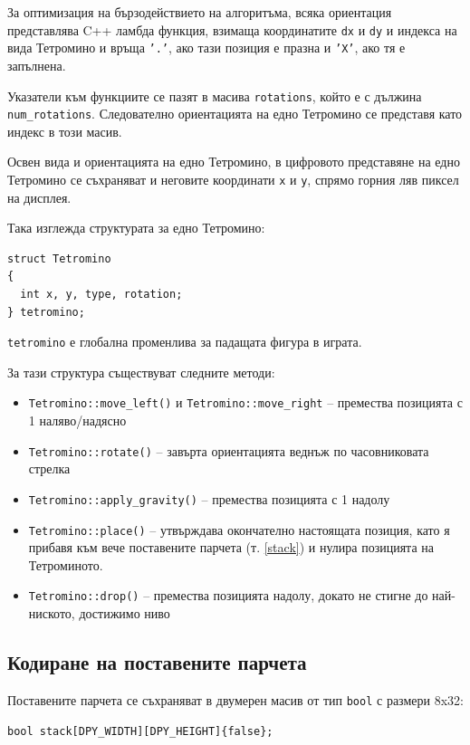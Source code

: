 \documentclass[titlepage, oneside, 12pt]{book}
\begin{document}
За оптимизация на бързодействието на алгоритъма, всяка ориентация представлява C++ ламбда функция, взимаща
координатите \texttt{dx} и \texttt{dy} и индекса на вида Тетромино и връща \texttt{'.'}, ако тази позиция е празна
и \texttt{'X'}, ако тя е запълнена.

Указатели към функциите се пазят в масива \texttt{rotations}, който е с дължина \texttt{num_rotations}. Следователно
ориентацията на едно Тетромино се представя като индекс в този масив.

Освен вида и ориентацията на едно Тетромино, в цифровото представяне на едно Тетромино се съхраняват и неговите
координати \texttt{x} и \texttt{y}, спрямо горния ляв пиксел на дисплея.

Така изглежда структурата за едно Тетромино:

\begin{verbatim}
struct Tetromino
{
  int x, y, type, rotation;
} tetromino;
\end{verbatim}

\texttt{tetromino} е глобална променлива за падащата фигура в играта.

За тази структура съществуват следните методи:

\begin{itemize}
  \item \texttt{Tetromino::move_left()} и \texttt{Tetromino::move_right} -- премества позицията с 1 наляво/надясно
  \item \texttt{Tetromino::rotate()} -- завърта ориентацията веднъж по часовниковата стрелка
  \item \texttt{Tetromino::apply_gravity()} -- премества позицията с 1 надолу
  \item \texttt{Tetromino::place()} -- утвърждава окончателно настоящата
    позиция, като я прибавя към вече поставените парчета (т. \ref{stack}) и нулира позицията на Тетроминото.
  \item \texttt{Tetromino::drop()} -- премества позицията надолу, докато не стигне до най-ниското, достижимо ниво
\end{itemize}

\subsection{Кодиране на поставените парчета}

Поставените парчета се съхраняват в двумерен масив от тип \texttt{bool} с размери 8x32:

\begin{verbatim}
bool stack[DPY_WIDTH][DPY_HEIGHT]{false};
\end{verbatim}
\end{document}
